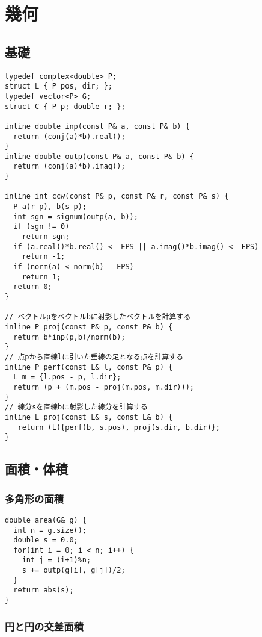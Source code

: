 \section{幾何}

\subsection{基礎}

\begin{lstlisting}
typedef complex<double> P;
struct L { P pos, dir; };
typedef vector<P> G;
struct C { P p; double r; };

inline double inp(const P& a, const P& b) {
  return (conj(a)*b).real();
}
inline double outp(const P& a, const P& b) {
  return (conj(a)*b).imag();
}

inline int ccw(const P& p, const P& r, const P& s) {
  P a(r-p), b(s-p);
  int sgn = signum(outp(a, b));
  if (sgn != 0)
    return sgn;
  if (a.real()*b.real() < -EPS || a.imag()*b.imag() < -EPS)
    return -1;
  if (norm(a) < norm(b) - EPS)
    return 1;
  return 0;
}

// ベクトルpをベクトルbに射影したベクトルを計算する
inline P proj(const P& p, const P& b) {
  return b*inp(p,b)/norm(b);
}
// 点pから直線lに引いた垂線の足となる点を計算する
inline P perf(const L& l, const P& p) {
  L m = {l.pos - p, l.dir};
  return (p + (m.pos - proj(m.pos, m.dir)));
}
// 線分sを直線bに射影した線分を計算する
inline L proj(const L& s, const L& b) {
   return (L){perf(b, s.pos), proj(s.dir, b.dir)};
}
\end{lstlisting}


\subsection{面積・体積}

\subsubsection{多角形の面積}

\begin{lstlisting}
double area(G& g) {
  int n = g.size();
  double s = 0.0;
  for(int i = 0; i < n; i++) {
    int j = (i+1)%n;
    s += outp(g[i], g[j])/2;
  }
  return abs(s);
}
\end{lstlisting}


\subsubsection{円と円の交差面積}

